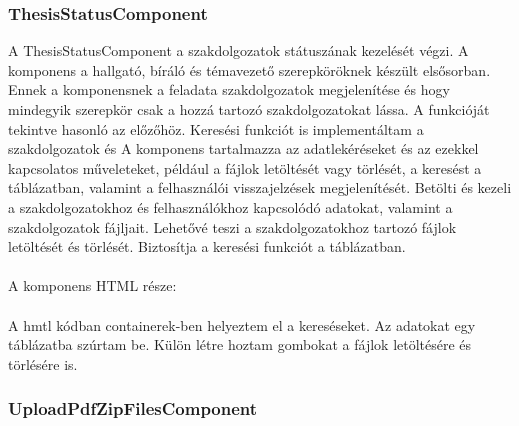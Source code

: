 \subsubsection{ThesisStatusComponent}

A ThesisStatusComponent a szakdolgozatok státuszának kezelését végzi. A komponens a hallgató, bíráló és témavezető szerepköröknek készült elsősorban. Ennek a komponensnek a feladata szakdolgozatok megjelenítése és hogy mindegyik szerepkör csak a hozzá tartozó szakdolgozatokat lássa. A funkcióját tekintve hasonló az előzőhöz. Keresési funkciót is implementáltam a szakdolgozatok és  A komponens tartalmazza az adatlekéréseket és az ezekkel kapcsolatos műveleteket, például a fájlok letöltését vagy törlését, a keresést a táblázatban, valamint a felhasználói visszajelzések megjelenítését. Betölti és kezeli a szakdolgozatokhoz és felhasználókhoz kapcsolódó adatokat, valamint a szakdolgozatok fájljait. Lehetővé teszi a szakdolgozatokhoz tartozó fájlok letöltését és törlését. Biztosítja a keresési funkciót a táblázatban.\\
\\
A komponens HTML része:\\
\\
A hmtl kódban containerek-ben helyeztem el a kereséseket. Az adatokat egy táblázatba szúrtam be. Külön létre hoztam gombokat a fájlok letöltésére és törlésére is.

\subsubsection{UploadPdfZipFilesComponent}

